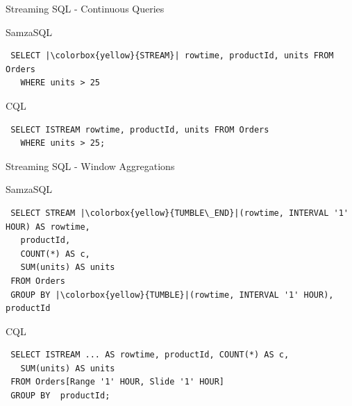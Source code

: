 \documentclass[newPxFont]{beamer}
\begin{document}
\begin{frame}[fragile]{Streaming SQL - Continuous Queries}

\begin{alertblock}{SamzaSQL}
 \begin{verbatim}
 SELECT |\colorbox{yellow}{STREAM}| rowtime, productId, units FROM Orders 
   WHERE units > 25
 \end{verbatim}
\end{alertblock}

\begin{exampleblock}{CQL}
 \begin{verbatim}
 SELECT ISTREAM rowtime, productId, units FROM Orders 
   WHERE units > 25;
 \end{verbatim}
\end{exampleblock}
\end{frame}


\begin{frame}[fragile]{Streaming SQL - Window Aggregations}

\begin{alertblock}{SamzaSQL}
 \begin{verbatim}
 SELECT STREAM |\colorbox{yellow}{TUMBLE\_END}|(rowtime, INTERVAL '1' HOUR) AS rowtime,
   productId,
   COUNT(*) AS c,
   SUM(units) AS units
 FROM Orders
 GROUP BY |\colorbox{yellow}{TUMBLE}|(rowtime, INTERVAL '1' HOUR), productId
 \end{verbatim}
\end{alertblock}

\begin{exampleblock}{CQL}
 \begin{verbatim}
 SELECT ISTREAM ... AS rowtime, productId, COUNT(*) AS c, 
   SUM(units) AS units
 FROM Orders[Range '1' HOUR, Slide '1' HOUR]
 GROUP BY  productId;
 \end{verbatim}
\end{exampleblock}

\end{frame}

\end{document}
